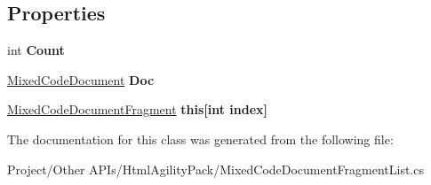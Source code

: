 \subsection*{Properties}
\begin{DoxyCompactItemize}
\item 
\mbox{\label{class_html_agility_pack_1_1_mixed_code_document_fragment_list_a6f126df60e9b829951be0fa4901a6f3d}} 
int {\bfseries Count}
\item 
\mbox{\label{class_html_agility_pack_1_1_mixed_code_document_fragment_list_a78a804d911d0d4af0b15e867b7fb4972}} 
\hyperlink{class_html_agility_pack_1_1_mixed_code_document}{Mixed\+Code\+Document} {\bfseries Doc}
\item 
\mbox{\label{class_html_agility_pack_1_1_mixed_code_document_fragment_list_a08a8326f2f72af58716cc533a685ad9c}} 
\hyperlink{class_html_agility_pack_1_1_mixed_code_document_fragment}{Mixed\+Code\+Document\+Fragment} {\bfseries this\mbox{[}int index\mbox{]}}
\end{DoxyCompactItemize}


The documentation for this class was generated from the following file\+:\begin{DoxyCompactItemize}
\item 
Project/\+Other A\+P\+Is/\+Html\+Agility\+Pack/Mixed\+Code\+Document\+Fragment\+List.\+cs\end{DoxyCompactItemize}
